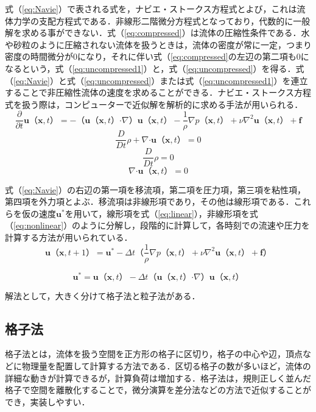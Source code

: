 \documentclass[a4j,12pt]{jreport}
\begin{document}
式（\ref{eq:Navie}）で表される式を，ナビエ・ストークス方程式とよび，これは流体力学の支配方程式である．非線形二階微分方程式となっており，代数的に一般解を求める事ができない．式（\ref{eq:compressed}）は流体の圧縮性条件である．水や砂粒のように圧縮されない流体を扱うときは，流体の密度が常に一定，つまり密度の時間微分が0になり，それに伴い式（\ref{eq:compressed}の左辺の第二項も0になるという，式（\ref{eq:uncompressed1}）と，式（\ref{eq:uncompressed}）を得る．式（\ref{eq:Navie}）と式（\ref{eq:uncompressed}）または式（\ref{eq:uncompressed1}）を連立することで非圧縮性流体の速度を求めることができる．ナビエ・ストークス方程式を扱う際は，コンピューターで近似解を解析的に求める手法が用いられる．
\begin{equation}\label{eq:Navie}
\frac{\partial}{\partial t}\bm{u}（\bm{x},t） = -（\bm{u}（\bm{x},t） \boldsymbol{\cdot}\nabla）\bm{u}（\bm{x},t）  - \frac{1}{\rho}\nabla p（\bm{x},t） + \nu\nabla^2\bm{u}（\bm{x},t） + \bm{f}
\end{equation}
\begin{equation}\label{eq:compressed}
\frac{D}{Dt}\rho + \nabla\boldsymbol{\cdot}\bm{u}（\bm{x},t） = 0
\end{equation}
\begin{equation}\label{eq:uncompressed1}
\frac{D}{Dt}\rho  = 0
\end{equation}
\begin{equation}\label{eq:uncompressed}
\nabla\boldsymbol{\cdot}\bm{u}（\bm{x},t） = 0
\end{equation}

式（\ref{eq:Navie}）の右辺の第一項を移流項，第二項を圧力項，第三項を粘性項，第四項を外力項とよぶ．移流項は非線形項であり，その他は線形項である．これらを仮の速度$\bm{u}^*$を用いて，線形項を式（\ref{eq:linear}），非線形項を式（\ref{eq:nonlinear}）のように分解し，段階的に計算して，各時刻での流速や圧力を計算する方法が用いられている．
\begin{equation}\label{eq:linear}
\bm{u}（\bm{x},t+1） =  \bm{u}^* - \varDelta t（\frac{1}{\rho}\nabla p（\bm{x},t） + \nu\nabla^2\bm{u}（\bm{x},t） + \bm{f}）
\end{equation} 

\begin{equation}\label{eq:nonlinear}
\bm{u}^* = \bm{u}（\bm{x},t） - \varDelta t（\bm{u}（\bm{x},t） \boldsymbol{\cdot}\nabla）\bm{u}（\bm{x},t） 
\end{equation}

解法として，大きく分けて格子法と粒子法がある．

\subsection{格子法} \label{subsec:grid}
格子法とは，流体を扱う空間を正方形の格子に区切り，格子の中心や辺，頂点などに物理量を配置して計算する方法である．区切る格子の数が多いほど，流体の詳細な動きが計算できるが，計算負荷は増加する．格子法は，規則正しく並んだ格子で空間を離散化することで，微分演算を差分法などの方法で近似することができ，実装しやすい．
\end{document}
